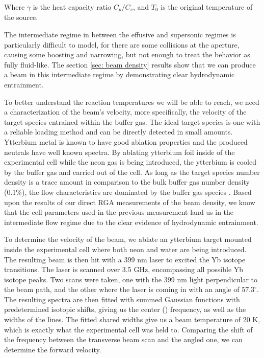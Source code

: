 Where $\gamma$ is the heat capacity ratio $C_p/C_v$, and $T_0$ is the original temperature of the source.

The intermediate regime in between the effusive and supersonic regimes is particularly difficult to model, for there are some collisions at the aperture, causing some boosting and narrowing, but not enough to treat the behavior as fully fluid-like. The section \ref{sec: beam density} results show that we can produce a beam in this intermediate regime by demonstrating clear hydrodynamic entrainment.

To better understand the reaction temperatures we will be able to reach, we need a characterization of the beam's velocity, more specifically, the velocity of the target species entrained within the buffer gas. The ideal target species is one with a reliable loading method and can be directly detected in small amounts. Ytterbium metal is known to have good ablation properties and the produced neutrals have well known spectra. By ablating ytterbium foil inside of the experimental cell while the neon gas is being introduced, the ytterbium is cooled by the buffer gas and carried out of the cell. As long as the target species number density is a trace amount in comparison to the bulk buffer gas number density (0.1\%), the flow characteristics are dominated by the buffer gas species \cite{Hutzler2012}. Based upon the results of our direct RGA measurements of the beam density, we know that the cell parameters used in the previous measurement land us in the intermediate flow regime due to the clear evidence of hydrodynamic entrainment.

To determine the velocity of the beam, we ablate an ytterbium target mounted inside the experimental cell where both neon and water are being introduced. The resulting beam is then hit with a 399 nm laser to excited the Yb isotope transitions. The laser is scanned over 3.5 GHz, encompassing all possible Yb isotope peaks. Two scans were taken, one with the 399 nm light perpendicular to the beam path, and the other where the laser is coming in with an angle of $57.3^\circ$. The resulting spectra are then fitted with summed Gaussian functions with predetermined isotopic shifts, giving us the center () frequency, as well as the widths of the lines. The fitted shared widths give us a beam temperature of 20 K, which is exactly what the experimental cell was held to. Comparing the shift of the  frequency between the transverse beam scan and the angled one, we can determine the forward velocity.

